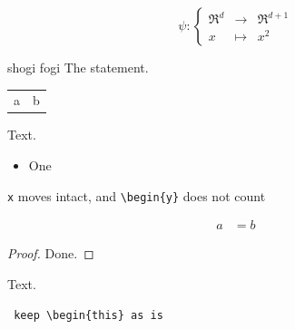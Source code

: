 \documentclass{article}
\begin{document}
\begin{equation*} \psi:\left\{
\begin{array}{rcl} \Re^d& \rightarrow& \Re^{d+1}\\x &\mapsto& x^2
\end{array}\right.
\end{equation*}

\begin{theorem}{shogi fogi} The statement.
\end{theorem}
\begin{tabular}{p{3cm}l} a & b \\
\end{tabular}
\begin{lemma}  Text.
\end{lemma}
\begin{itemize} \item One
\end{itemize}
\begin{center} \verb|x| moves intact, and \verb|\begin{y}| does not count
\end{center}
\begin{equation*}\begin{aligned} a &= b
\end{aligned}\end{equation*}

\begin{proof} %
Done.
\end{proof}
\begin{theorem} Text.
\end{theorem}
\begin{verbatim} keep \begin{this} as is
\end{verbatim}
\end{document}
